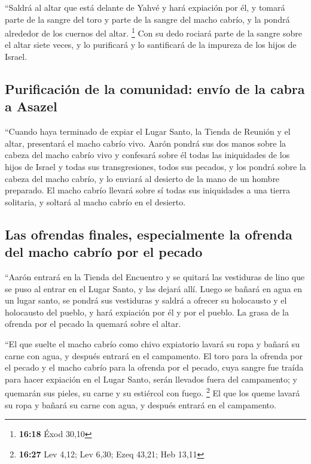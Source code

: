 \begin{paracol}{2}
 ``Saldrá al altar que está delante de Yahvé y hará
expiación por él, y tomará parte de la sangre del toro y parte de la
sangre del macho cabrío, y la pondrá alrededor de los cuernos del altar.
\footnote{\textbf{16:18} Éxod 30,10}  Con su dedo rociará
parte de la sangre sobre el altar siete veces, y lo purificará y lo
santificará de la impureza de los hijos de Israel.

\hypertarget{purificaciuxf3n-de-la-comunidad-envuxedo-de-la-cabra-a-asazel}{%
\subsection{Purificación de la comunidad: envío de la cabra a
Asazel}\label{purificaciuxf3n-de-la-comunidad-envuxedo-de-la-cabra-a-asazel}}

 ``Cuando haya terminado de expiar el Lugar Santo, la
Tienda de Reunión y el altar, presentará el macho cabrío vivo.
 Aarón pondrá sus dos manos sobre la cabeza del macho
cabrío vivo y confesará sobre él todas las iniquidades de los hijos de
Israel y todas sus transgresiones, todos sus pecados, y los pondrá sobre
la cabeza del macho cabrío, y lo enviará al desierto de la mano de un
hombre preparado.  El macho cabrío llevará sobre sí todas
sus iniquidades a una tierra solitaria, y soltará al macho cabrío en el
desierto.

\hypertarget{las-ofrendas-finales-especialmente-la-ofrenda-del-macho-cabruxedo-por-el-pecado}{%
\subsection{Las ofrendas finales, especialmente la ofrenda del macho
cabrío por el
pecado}\label{las-ofrendas-finales-especialmente-la-ofrenda-del-macho-cabruxedo-por-el-pecado}}

 ``Aarón entrará en la Tienda del Encuentro y se quitará
las vestiduras de lino que se puso al entrar en el Lugar Santo, y las
dejará allí.  Luego se bañará en agua en un lugar santo,
se pondrá sus vestiduras y saldrá a ofrecer su holocausto y el
holocausto del pueblo, y hará expiación por él y por el pueblo.
 La grasa de la ofrenda por el pecado la quemará sobre el
altar.

 ``El que suelte el macho cabrío como chivo expiatorio
lavará su ropa y bañará su carne con agua, y después entrará en el
campamento.  El toro para la ofrenda por el pecado y el
macho cabrío para la ofrenda por el pecado, cuya sangre fue traída para
hacer expiación en el Lugar Santo, serán llevados fuera del campamento;
y quemarán sus pieles, su carne y su estiércol con fuego. \footnote{\textbf{16:27}
  Lev 4,12; Lev 6,30; Ezeq 43,21; Heb 13,11}  El que los
queme lavará su ropa y bañará su carne con agua, y después entrará en el
campamento.


\end{paracol}
